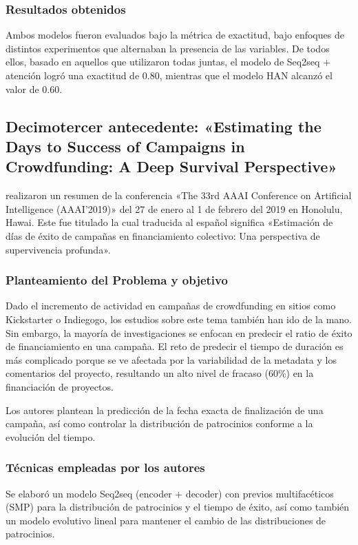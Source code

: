 \subsubsection{Resultados obtenidos}
Ambos modelos fueron evaluados bajo la métrica de exactitud, bajo enfoques de distintos experimentos que alternaban la presencia de las variables. De todos ellos, basado en aquellos que utilizaron todas juntas, el modelo de Seq2seq + atención logró una exactitud de 0.80, mientras que el modelo HAN alcanzó el valor de 0.60.

\subsection{Decimotercer antecedente: «Estimating the Days to Success of Campaigns in Crowdfunding: A Deep Survival Perspective» \citep*{pr_jin2019dayssuccess}}
\citeauthor{pr_jin2019dayssuccess} realizaron un resumen de la conferencia «The 33rd AAAI Conference on Artificial Intelligence (AAAI'2019)» del 27 de enero al 1 de febrero del 2019 en Honolulu, Hawai. Este fue titulado  la cual traducida al español significa «Estimación de días de éxito de campañas en financiamiento colectivo: Una perspectiva de supervivencia profunda».

\subsubsection{Planteamiento del Problema y objetivo}
Dado el incremento de actividad en campañas de crowdfunding en sitios como Kickstarter o Indiegogo, los estudios sobre este tema también han ido de la mano. Sin embargo, la mayoría de investigaciones se enfocan en predecir el ratio de éxito de financiamiento en una campaña. El reto de predecir el tiempo de duración es más complicado porque se ve afectada por la variabilidad de la metadata y los comentarios del proyecto, resultando un alto nivel de fracaso (60\%) en la financiación de proyectos.

Los autores plantean la predicción de la fecha exacta de finalización de una campaña, así como controlar la distribución de patrocinios conforme a la evolución del tiempo.

\subsubsection{Técnicas empleadas por los autores}
Se elaboró un modelo Seq2seq (encoder + decoder) con previos multifacéticos (SMP) para la distribución de patrocinios y el tiempo de éxito, así como también un modelo evolutivo lineal para mantener el cambio de las distribuciones de patrocinios.

